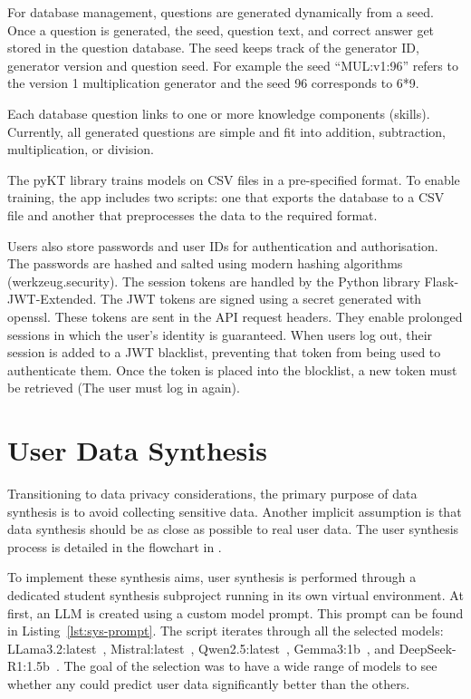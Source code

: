 For database management, questions are generated dynamically from a seed. Once a question is generated, the seed, question text, and correct answer get stored in the question database. The seed keeps track of the generator ID, generator version and question seed. For example the seed ``MUL:v1:96'' refers to the version 1 multiplication generator and the seed 96 corresponds to 6*9.

Each database question links to one or more knowledge components (skills). Currently, all generated questions are simple and fit into addition, subtraction, multiplication, or division.

The pyKT library trains models on CSV files in a pre-specified format. To enable training, the app includes two scripts: one that exports the database to a CSV file and another that preprocesses the data to the required format.

Users also store passwords and user IDs for authentication and authorisation. The passwords are hashed and salted using modern hashing algorithms (werkzeug.security). The session tokens are handled by the Python library Flask-JWT-Extended. The JWT tokens are signed using a secret generated with openssl. These tokens are sent in the API request headers. They enable prolonged sessions in which the user's identity is guaranteed. When users log out, their session is added to a JWT blacklist, preventing that token from being used to authenticate them. Once the token is placed into the blocklist, a new token must be retrieved (The user must log in again).

\section{User Data Synthesis}
Transitioning to data privacy considerations, the primary purpose of data synthesis is to avoid collecting sensitive data. Another implicit assumption is that data synthesis should be as close as possible to real user data. The user synthesis process is detailed in the flowchart in .

To implement these synthesis aims, user synthesis is performed through a dedicated student synthesis subproject running in its own virtual environment. At first, an LLM is created using a custom model prompt. This prompt can be found in Listing~\ref{lst:sys-prompt}. The script iterates through all the selected models: LLama3.2:latest~\autocite{llama3}, Mistral:latest~\autocite{mistral7b}, Qwen2.5:latest~\autocite{qwen2.5}, Gemma3:1b~\autocite{gemma_2025}, and DeepSeek-R1:1.5b~\autocite{deepseek-r1}. The goal of the selection was to have a wide range of models to see whether any could predict user data significantly better than the others.

